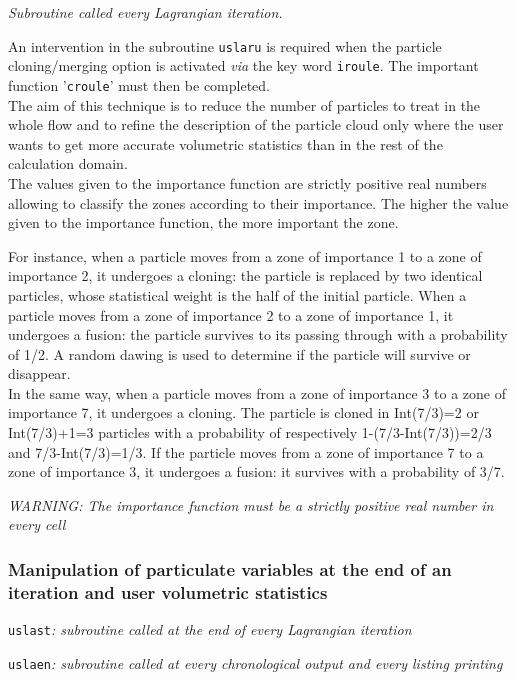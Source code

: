 {{{\noindent
\textit{Subroutine called every Lagrangian iteration.}

\noindent
An intervention in the subroutine \texttt{uslaru} is required when the particle
cloning/merging option is activated {\em via} the key word \texttt{iroule}. The
important function '\texttt{croule}' must then be completed. \\
The aim of this technique is to reduce the number of particles to treat in
the whole flow and to refine the description of the particle cloud only
where the user wants to get more accurate volumetric statistics than in the
rest of the calculation domain. \\
The values given to the importance function are strictly positive real
numbers allowing to classify the zones according to their
importance. The higher the value given to the importance function, the
more important the zone.

\noindent
For instance, when a particle moves from a zone of importance 1 to a
zone of importance 2, it undergoes a cloning: the particle is replaced by two
identical particles, whose statistical weight is the half of the initial
particle. When a particle moves from a zone of importance 2 to a zone of
importance 1, it undergoes a fusion: the particle survives to its passing
through with a probability of 1/2. A random dawing is used to
determine if the particle will survive or disappear.\\
In the same way, when a particle moves from a zone of importance 3 to a
zone of importance 7, it undergoes a cloning. The particle is cloned in
Int(7/3)=2 or Int(7/3)+1=3 particles with a probability of respectively
1-(7/3-Int(7/3))=2/3 and 7/3-Int(7/3)=1/3. If the particle moves from a
zone of importance 7 to a zone of importance 3, it undergoes a fusion:
it survives with a probability of 3/7.

\noindent
\emph{WARNING: The importance function must be a strictly positive real
number in every cell}

\subsubsection{Manipulation of particulate variables at the end of an
   iteration and user volumetric statistics}

\noindent
\texttt{uslast}\textit{: subroutine called at the end of every
Lagrangian iteration}

\noindent
\texttt{uslaen}\textit{: subroutine called at every chronological output
and every listing printing}

}}}
